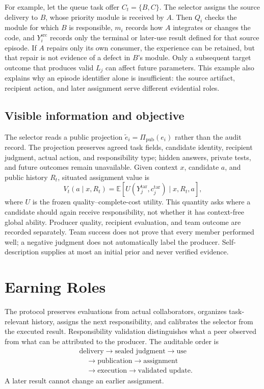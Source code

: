 \documentclass[sigconf,anonymous]{aamas}
\begin{document}
For example, let the queue task offer $C_t=\{B,C\}$. The selector assigns the source delivery to $B$, whose priority module is received by $A$. Then $Q_i$ checks the module for which $B$ is responsible, $m_i$ records how $A$ integrates or changes the code, and $Y_i^{\mathrm{src}}$ records only the terminal or later-use result defined for that source episode. If $A$ repairs only its own consumer, the experience can be retained, but that repair is not evidence of a defect in $B$'s module. Only a subsequent target outcome that produces valid $L_j$ can affect future parameters. This example also explains why an episode identifier alone is insufficient: the source artifact, recipient action, and later assignment serve different evidential roles.

\subsection{Visible information and objective}
The selector reads a public projection $\tilde e_i=\Pi_{\mathrm{pub}}(e_i)$ rather than the audit record. The projection preserves agreed task fields, candidate identity, recipient judgment, actual action, and responsibility type; hidden answers, private tests, and future outcomes remain unavailable. Given context $x$, candidate $a$, and public history $R_t$, situated assignment value is
\begin{equation}
 V_t(a\mid x,R_t)=\mathbb{E}[U(Y_j^{\mathrm{tar}},c_j^{\mathrm{tar}})\mid x,R_t,a],
\label{eq:value}
\end{equation}
where $U$ is the frozen quality--complete-cost utility. This quantity asks where a candidate should again receive responsibility, not whether it has context-free global ability. Producer quality, recipient evaluation, and team outcome are recorded separately. Team success does not prove that every member performed well; a negative judgment does not automatically label the producer. Self-description supplies at most an initial prior and never verified evidence.

\section{Earning Roles}
\label{sec:method}
The protocol preserves evaluations from actual collaborators, organizes task-relevant history, assigns the next responsibility, and calibrates the selector from the executed result. Responsibility validation distinguishes what a peer observed from what can be attributed to the producer. The auditable order is
\begin{equation}
\begin{aligned}
&\text{delivery}\rightarrow\text{sealed judgment}\rightarrow\text{use}\\
&\quad\rightarrow\text{publication}\rightarrow\text{assignment}\\
&\quad\rightarrow\text{execution}\rightarrow\text{validated update}.
\end{aligned}
\label{eq:order}
\end{equation}
A later result cannot change an earlier assignment.
\end{document}

